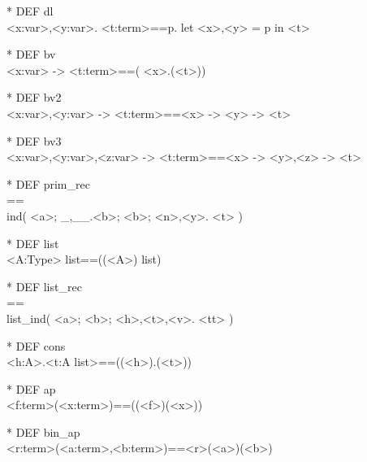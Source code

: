 \begin{prl*}
\>* DEF dl\\
\>  \mlambda{} <x:var>,<y:var>. <t:term>==\mlambda{}p. let <x>,<y> = p in <t>
\end{prl*}

\begin{prl*}
\>* DEF bv\\
\>  <x:var> -> <t:term>==(\mbackslash{} <x>.(<t>))
\end{prl*}

\begin{prl*}
\>* DEF bv2\\
\>  <x:var>,<y:var> -> <t:term>==<x> -> <y> -> <t>
\end{prl*}

\begin{prl*}
\>* DEF bv3\\
\>  <x:var>,<y:var>,<z:var> -> <t:term>==<x> -> <y>,<z> -> <t>
\end{prl*}

\begin{prl*}
\>* DEF prim\_rec\\
==\\
\>  ind( <a>; \_,\_\_.<b>; <b>; <n>,<y>. <t> )
\end{prl*}

\begin{prl*}
\>* DEF list\\
\>  <A:Type> list==((<A>) list)
\end{prl*}

\begin{prl*}
\>* DEF list\_rec\\
==\\
\>  list\_ind( <a>; <b>; <h>,<t>,<v>. <tt> )
\end{prl*}

\begin{prl*}
\>* DEF cons\\
\>  <h:A>.<t:A list>==((<h>).(<t>))
\end{prl*}

\begin{prl*}
\>* DEF ap\\
\>  <f:term>(<x:term>)==((<f>)(<x>))
\end{prl*}

\begin{prl*}
\>* DEF bin\_ap\\
\>  <r:term>(<a:term>,<b:term>)==<r>(<a>)(<b>)
\end{prl*}

